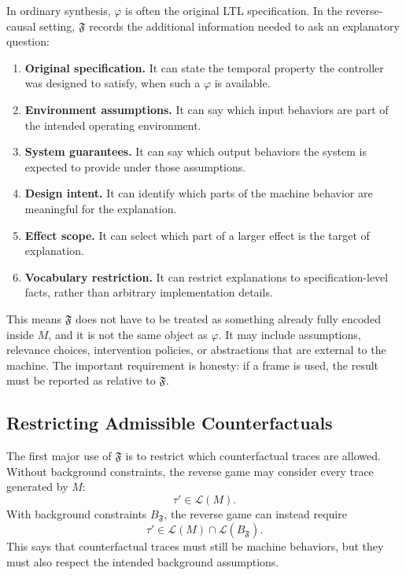 \documentclass[11pt]{article}
\theoremstyle{remark}
\newcommand{\Lang}{\mathcal{L}}
\newcommand{\Frame}{\mathfrak{F}}
\begin{document}
In ordinary synthesis, \(\varphi\) is often the original LTL specification. In
the reverse-causal setting, \(\Frame\) records the additional information needed
to ask an explanatory question:
\begin{enumerate}[label=\arabic*.]
  \item \textbf{Original specification.} It can state the temporal property the
        controller was designed to satisfy, when such a \(\varphi\) is
        available.
  \item \textbf{Environment assumptions.} It can say which input behaviors are
        part of the intended operating environment.
  \item \textbf{System guarantees.} It can say which output behaviors the
        system is expected to provide under those assumptions.
  \item \textbf{Design intent.} It can identify which parts of the machine
        behavior are meaningful for the explanation.
  \item \textbf{Effect scope.} It can select which part of a larger effect is
        the target of explanation.
  \item \textbf{Vocabulary restriction.} It can restrict explanations to
        specification-level facts, rather than arbitrary implementation details.
\end{enumerate}

This means \(\Frame\) does not have to be treated as something already fully
encoded inside \(M\), and it is not the same object as \(\varphi\). It may
include assumptions, relevance choices, intervention policies, or abstractions
that are external to the machine. The important requirement is honesty: if a
frame is used, the result must be reported as relative to \(\Frame\).

\subsection{Restricting Admissible Counterfactuals}

The first major use of \(\Frame\) is to restrict which counterfactual traces
are allowed. Without background constraints, the reverse game may consider every trace
generated by \(M\):
\[
  \tau' \in \Lang(M).
\]
With background constraints \(B_{\Frame}\), the reverse game can instead require
\[
  \tau' \in \Lang(M)\cap\Lang(B_{\Frame}).
\]
This says that counterfactual traces must still be machine behaviors, but they
must also respect the intended background assumptions.
\end{document}
